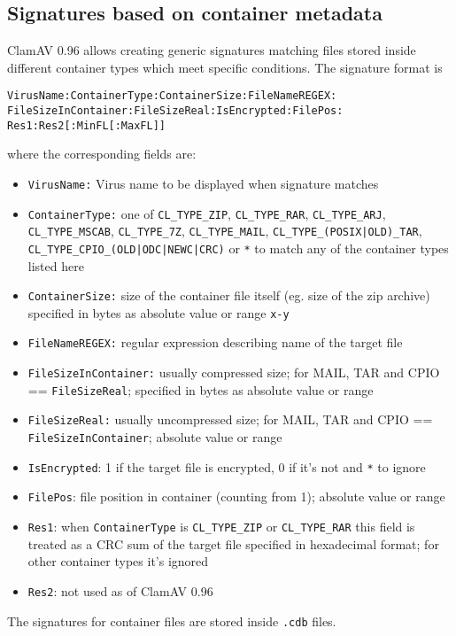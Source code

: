 \documentclass[a4paper,titlepage,12pt]{article}
\begin{document}
    \subsection{Signatures based on container metadata}
    ClamAV 0.96 allows creating generic signatures matching files stored
    inside different container types which meet specific conditions.
    The signature format is
\begin{verbatim}
VirusName:ContainerType:ContainerSize:FileNameREGEX:
FileSizeInContainer:FileSizeReal:IsEncrypted:FilePos:
Res1:Res2[:MinFL[:MaxFL]]
\end{verbatim}
    where the corresponding fields are:
    \begin{itemize}
	\item \verb+VirusName:+ Virus name to be displayed when signature matches
	\item \verb+ContainerType:+ one of \verb+CL_TYPE_ZIP+, \verb+CL_TYPE_RAR+,
	\verb+CL_TYPE_ARJ+,\\
	\verb+CL_TYPE_MSCAB+, \verb+CL_TYPE_7Z+, \verb+CL_TYPE_MAIL+, \verb+CL_TYPE_(POSIX|OLD)_TAR+,\\
	\verb+CL_TYPE_CPIO_(OLD|ODC|NEWC|CRC)+ or \verb+*+ to match
	any of the container types listed here
	\item \verb+ContainerSize:+ size of the container file itself (eg. size of
	the zip archive) specified in bytes as absolute value or range \verb+x-y+
	\item \verb+FileNameREGEX:+ regular expression describing name of the target file
	\item \verb+FileSizeInContainer:+ usually compressed size; for MAIL, TAR and CPIO ==
	\verb+FileSizeReal+; specified in bytes as absolute value or range
	\item \verb+FileSizeReal:+ usually uncompressed size; for MAIL, TAR and CPIO ==
	\verb+FileSizeInContainer+; absolute value or range
	\item \verb+IsEncrypted+: 1 if the target file is encrypted, 0 if it's not and
	\verb+*+ to ignore
	\item \verb+FilePos+: file position in container (counting from 1); absolute value
	or range
	\item \verb+Res1+: when \verb+ContainerType+ is \verb+CL_TYPE_ZIP+ or
	\verb+CL_TYPE_RAR+ this field is treated as a CRC sum of the target file
	specified in hexadecimal format; for other container types it's ignored
	\item \verb+Res2+: not used as of ClamAV 0.96
    \end{itemize}
    The signatures for container files are stored inside \verb+.cdb+ files.
\end{document}
